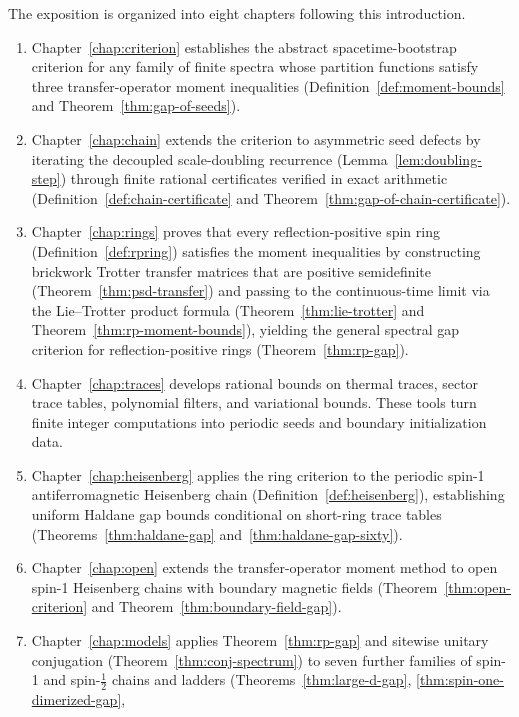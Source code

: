 The exposition is organized into eight chapters following this introduction.
\begin{enumerate}
  \item Chapter~\ref{chap:criterion} establishes the abstract spacetime-bootstrap criterion for any
    family of finite spectra whose partition functions satisfy three transfer-operator moment
    inequalities (Definition~\ref{def:moment-bounds} and Theorem~\ref{thm:gap-of-seeds}).
  \item Chapter~\ref{chap:chain} extends the criterion to asymmetric seed defects by iterating the
    decoupled scale-doubling recurrence (Lemma~\ref{lem:doubling-step}) through finite rational
    certificates verified in exact arithmetic (Definition~\ref{def:chain-certificate} and
    Theorem~\ref{thm:gap-of-chain-certificate}).
  \item Chapter~\ref{chap:rings} proves that every reflection-positive spin ring
    (Definition~\ref{def:rpring}) satisfies the moment inequalities by constructing brickwork
    Trotter transfer matrices that are positive semidefinite (Theorem~\ref{thm:psd-transfer}) and
    passing to the continuous-time limit via the Lie--Trotter product formula
    (Theorem~\ref{thm:lie-trotter} and Theorem~\ref{thm:rp-moment-bounds}), yielding the general
    spectral gap criterion for reflection-positive rings (Theorem~\ref{thm:rp-gap}).
  \item Chapter~\ref{chap:traces} develops rational bounds on thermal traces, sector trace tables,
    polynomial filters, and variational bounds. These tools turn finite integer computations
    into periodic seeds and boundary initialization data.
  \item Chapter~\ref{chap:heisenberg} applies the ring criterion to the periodic spin-1
    antiferromagnetic Heisenberg chain (Definition~\ref{def:heisenberg}), establishing uniform
    Haldane gap bounds conditional on short-ring trace tables
    (Theorems~\ref{thm:haldane-gap} and~\ref{thm:haldane-gap-sixty}).
  \item Chapter~\ref{chap:open} extends the transfer-operator moment method to open spin-1
    Heisenberg chains with boundary magnetic fields (Theorem~\ref{thm:open-criterion} and
    Theorem~\ref{thm:boundary-field-gap}).
  \item Chapter~\ref{chap:models} applies Theorem~\ref{thm:rp-gap} and sitewise unitary conjugation
    (Theorem~\ref{thm:conj-spectrum}) to seven further families of spin-1 and spin-\(\tfrac12\)
    chains and ladders (Theorems~\ref{thm:large-d-gap}, \ref{thm:spin-one-dimerized-gap},

\end{enumerate}
